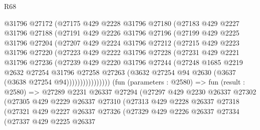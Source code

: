 \begin{lexlean}{R68}
\begin{coremodule}
              @31796
              @27172
              (@27175
                @429
                @2228
                @31796
                @27180
                (@27183
                  @429
                  @2227
                  @31796
                  @27188
                  (@27191
                    @429
                    @2226
                    @31796
                    @27196
                    (@27199
                      @429
                      @2225
                      @31796
                      @27204
                      (@27207
                        @429
                        @2224
                        @31796
                        @27212
                        (@27215
                          @429
                          @2223
                          @31796
                          @27220
                          (@27223
                            @429
                            @2222
                            @31796
                            @27228
                            (@27231
                              @429
                              @2221
                              @31796
                              @27236
                              (@27239
                                @429
                                @2220
                                @31796
                                @27244
                                (@27248
                                  @1685
                                  @2219
                                  @2632
                                  @27254
                                  @31796
                                  @27258
                                  @27263
                                  (@3632 @27254 @94 @2630 (@3637 (@3638 @27254 @94))))))))))))))))
        (fun (parameters : @2580) =>
        fun (result : @2580) =>
        @27289
          @2231
          @26337
          @27294
          (@27297
            @429
            @2230
            @26337
            @27302
            (@27305
              @429
              @2229
              @26337
              @27310
              (@27313
                @429
                @2228
                @26337
                @27318
                (@27321
                  @429
                  @2227
                  @26337
                  @27326
                  (@27329
                    @429
                    @2226
                    @26337
                    @27334
                    (@27337
                      @429
                      @2225
                      @26337

\end{coremodule}
\end{lexlean}
